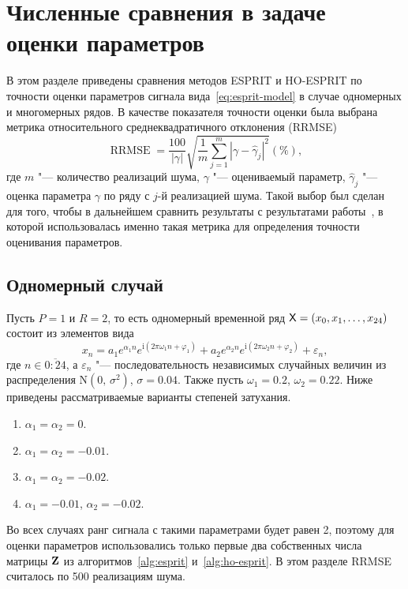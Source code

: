 \documentclass[specialist,
  substylefile=spbu.rtx,
subf,href,colorlinks=true, 12pt]{disser}
\theoremstyle{plain}
\theoremstyle{definition}
\theoremstyle{remark}
\newcommand{\iu}{\mathrm{i}}
\begin{document}
\section{Численные сравнения в задаче оценки параметров}
В этом разделе приведены сравнения методов ESPRIT и HO-ESPRIT по точности оценки параметров сигнала
вида~\eqref{eq:esprit-model} в случае одномерных и многомерных рядов.
В качестве показателя точности оценки была выбрана метрика относительного среднеквадратичного
отклонения (RRMSE)
\begin{equation}
  \label{eq:rrmse}
  \operatorname{RRMSE} = \frac{100}{|\gamma|}\sqrt{\frac{1}{m} \sum_{j=1}^{m} \left|\gamma-\widehat{\gamma}_j\right|^2} (\%),
\end{equation}
где $m$ "--- количество реализаций шума, $\gamma$ "--- оцениваемый параметр, $\widehat{\gamma}_j$ "---
оценка параметра $\gamma$ по ряду с $j$-й реализацией шума.
Такой выбор был сделан для того, чтобы в дальнейшем сравнить результаты с результатами
работы~\cite{hosvd-hooi-separation}, в которой использовалась именно такая метрика для определения
точности оценивания параметров.

\subsection{Одномерный случай}
Пусть $P=1$ и $R=2$, то есть одномерный временной ряд $\mathsf{X} = \left(x_0, x_1, \ldots, x_{24}\right)$
состоит из элементов вида
\[
  x_n = a_1 e^{ \alpha_1 n }
  e^{\iu \left( 2 \pi \omega_1 n + \varphi_1\right)} +
  a_2 e^{ \alpha_2 n }
  e^{\iu \left( 2 \pi \omega_2 n + \varphi_2\right)} + \varepsilon_n,
\]
где $n \in \overline{0:24}$, а $\varepsilon_n$ "--- последовательность независимых случайных величин из
распределения $\mathrm{N}(0,\, \sigma^2)$, $\sigma=0.04$.
Также пусть $\omega_1 = 0.2$, $\omega_2 = 0.22$.
Ниже приведены рассматриваемые варианты степеней затухания.
\begin{enumerate}
  \item\label{enum:esprit-no-rates} $\alpha_1=\alpha_2=0$.
  \item\label{enum:esprit-smalleq-rates} $\alpha_1=\alpha_2=-0.01$.
  \item\label{enum:esprit-bigeq-rates} $\alpha_1=\alpha_2=-0.02$.
  \item\label{enum:esprit-diff-rates} $\alpha_1= -0.01$, $\alpha_2=-0.02$.
\end{enumerate}
Во всех случаях ранг сигнала с такими параметрами будет равен 2, поэтому для оценки параметров
использовались только первые два собственных числа матрицы $\mathbf{Z}$ из алгоритмов~\ref{alg:esprit}
и~\ref{alg:ho-esprit}.
В этом разделе RRMSE считалось по 500 реализациям шума.
\end{document}
